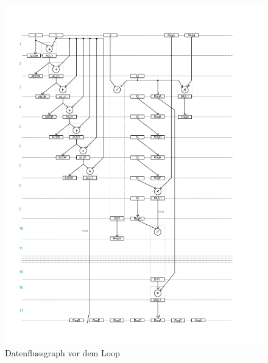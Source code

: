 \documentclass{article}
\begin{document}
    \begin{figure}
        \includegraphics[width=\textwidth]{../Diagramme/Datenflussdiagramm/DFG_VorerstFinal_S1.png}
        \caption{Datenflussgraph vor dem Loop}
        \label{DFG1}
    \end{figure}
\end{document}
